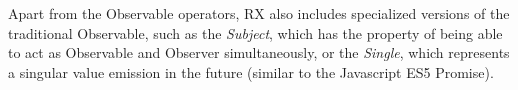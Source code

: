 Apart from the Observable operators, \gls{RX} also includes specialized versions of the traditional Observable, such as the \emph{Subject}, which has the property of being able to act as Observable and Observer simultaneously, or the \emph{Single}, which represents a singular value emission in the future (similar to the Javascript ES5 Promise).

%
